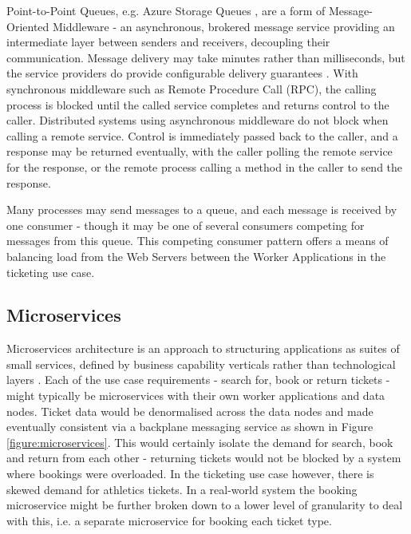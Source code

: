 \documentclass[runningheads]{llncs}
\begin{document}
Point-to-Point Queues, e.g. Azure Storage Queues \cite{RN1072}, are a form of Message-Oriented Middleware - an asynchronous, brokered message service providing an intermediate layer between senders and receivers, decoupling their communication.  Message delivery may take minutes rather than milliseconds, but the service providers do provide configurable delivery guarantees \cite{RN65}.  With synchronous middleware such as Remote Procedure Call (RPC), the calling process is blocked until the called service completes and returns control to the caller.  Distributed systems using asynchronous middleware do not block when calling a remote service.  Control is immediately passed back to the caller, and a response may be returned eventually, with the caller polling the remote service for the response, or the remote process calling a method in the caller to send the response.

Many processes may send messages to a queue, and each message is received by one consumer - though it may be one of several consumers competing for messages from this queue.  This competing consumer pattern offers a means of balancing load from the Web Servers between the Worker Applications in the ticketing use case.

%
%
\FloatBarrier
\subsection{Microservices}\label{sec:microservices}

Microservices architecture is an approach to structuring applications as suites of small services, defined by business capability verticals rather than technological layers \cite{RN1069,RN1070}.  Each of the use case requirements - search for, book or return tickets - might typically be microservices with their own worker applications and data nodes.  Ticket data would be denormalised across the data nodes and made eventually consistent via a backplane messaging service \cite{RN1071} as shown in Figure \ref{figure:microservices}.  This would certainly isolate the demand for search, book and return from each other - returning tickets would not be blocked by a system where bookings were overloaded.  In the ticketing use case however, there is skewed demand for athletics tickets.  In a real-world system the booking microservice might be further broken down to a lower level of granularity to deal with this, i.e. a separate microservice for booking each ticket type.
\end{document}
